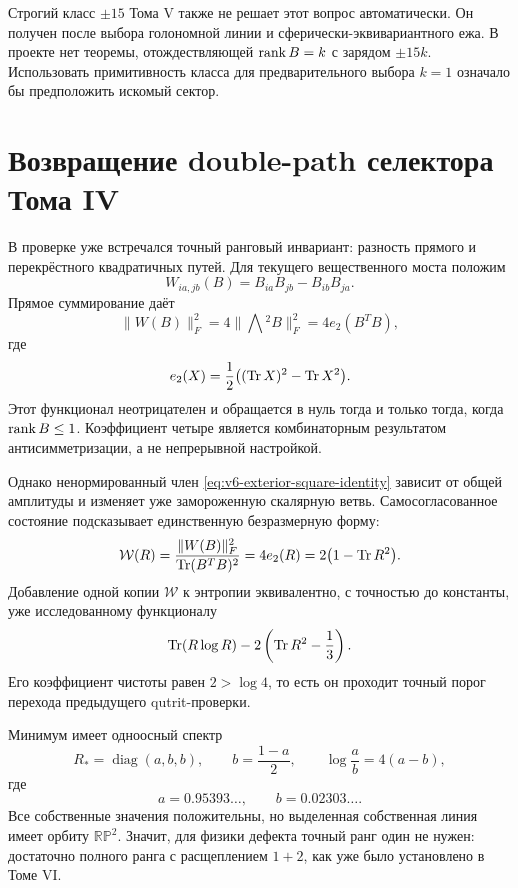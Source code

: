Строгий класс $\pm15$ Тома V также не решает этот вопрос автоматически.
Он получен после выбора голономной линии и сферически-эквивариантного ежа.
В проекте нет теоремы, отождествляющей $\operatorname{rank} B=k$ с зарядом
$\pm15k$. Использовать примитивность класса для предварительного выбора
$k=1$ означало бы предположить искомый сектор.

\section{Возвращение double-path селектора Тома IV}

В проверке
уже встречался точный ранговый инвариант: разность прямого и перекрёстного
квадратичных путей. Для текущего вещественного моста положим
\begin{equation}
 W_{ia,jb}(B)=B_{ia}B_{jb}-B_{ib}B_{ja}.
\end{equation}
Прямое суммирование даёт
\begin{equation}
 \boxed{
 \|W(B)\|_F^2
 =4\|\bigwedge{}^2B\|_F^2
 =4e_2(B^TB),}
 \label{eq:v6-exterior-square-identity}
\end{equation}
где
\begin{equation}
 e_2(X)=\frac12\bigl((\operatorname{Tr} X)^2-\operatorname{Tr} X^2\bigr).
\end{equation}
Этот функционал неотрицателен и обращается в нуль тогда и только тогда,
когда $\operatorname{rank} B\leq1$. Коэффициент четыре является комбинаторным
результатом антисимметризации, а не непрерывной настройкой.

Однако ненормированный член \eqref{eq:v6-exterior-square-identity}
зависит от общей амплитуды и изменяет уже замороженную скалярную ветвь.
Самосогласованное состояние подсказывает единственную безразмерную форму:
\begin{equation}
 \mathcal W(R)
 =\frac{\|W(B)\|_F^2}{\operatorname{Tr}(B^TB)^2}
 =4e_2(R)
 =2\bigl(1-\operatorname{Tr} R^2\bigr).
 \label{eq:v6-normalized-wedge-state}
\end{equation}
Добавление одной копии $\mathcal W$ к энтропии эквивалентно, с точностью
до константы, уже исследованному функционалу
\begin{equation}
 \operatorname{Tr}(R\log R)-2\left(\operatorname{Tr} R^2-\frac13\right).
 \label{eq:v6-wedge-purity-coefficient}
\end{equation}
Его коэффициент чистоты равен $2>\log4$, то есть он проходит точный порог
перехода предыдущего qutrit-проверки.

Минимум имеет одноосный спектр
\begin{equation}
 R_*=\operatorname{diag}(a,b,b),
 \qquad b=\frac{1-a}{2},
 \qquad
 \log\frac ab=4(a-b),
\end{equation}
где
\begin{equation}
 a=0.95393\ldots,
 \qquad b=0.02303\ldots.
 \label{eq:v6-wedge-ordered-spectrum}
\end{equation}
Все собственные значения положительны, но выделенная собственная линия
имеет орбиту $\mathbb{RP}^2$. Значит, для физики дефекта точный ранг один
не нужен: достаточно полного ранга с расщеплением $1+2$, как уже было
установлено в Томе VI.


